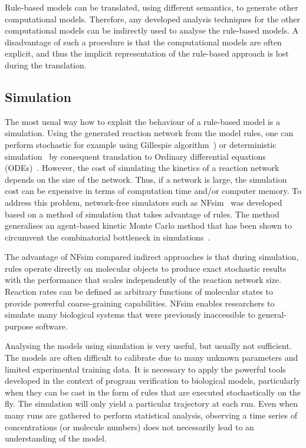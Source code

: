 \documentclass[11pt,a4paper]{report}
\begin{document}
Rule-based models can be translated, using different semantics, to generate other computational models. Therefore, any developed analysis techniques for the other computational models can be indirectly used to analyse the rule-based models. A disadvantage of such a procedure is that the computational models are often explicit, and thus the implicit representation of the rule-based approach is lost during the translation.

\subsection{Simulation}

The most usual way how to exploit the behaviour of a rule-based model is a simulation. Using the generated reaction network from the model rules, one can perform stochastic for example using Gillespie algorithm~\cite{GILLESPIE1976403}) or deterministic simulation~\cite{Poole2000} by consequent translation to Ordinary differential equations (ODEs)~\cite{higham2008modeling}. However, the cost of simulating the kinetics of a reaction network depends on the size of the network. Thus, if a network is large, the simulation cost can be expensive in terms of computation time and/or computer memory. To address this problem, network-free simulators such as NFsim~\cite{sneddon2011efficient} was developed based on a method of simulation that takes advantage of rules. The method generalises an agent-based kinetic Monte Carlo method that has been shown to circumvent the combinatorial bottleneck in simulations~\cite{yang2008kinetic}.

The advantage of NFsim compared indirect approaches is that during simulation, rules operate directly on molecular objects to produce exact stochastic results with the performance that scales independently of the reaction network size. Reaction rates can be defined as arbitrary functions of molecular states to provide powerful coarse-graining capabilities. NFsim enables researchers to simulate many biological systems that were previously inaccessible to general-purpose software.

Analysing the models using simulation is very useful, but usually not sufficient. The models are often difficult to calibrate due to many unknown parameters and limited experimental training data. It is necessary to apply the powerful tools developed in the context of program verification to biological models, particularly when
they can be cast in the form of rules that are executed stochastically on the fly. The simulation will only yield a particular trajectory at each run. Even when many runs are gathered to perform statistical analysis, observing a time series of concentrations (or molecule numbers) does not necessarily lead to an understanding of the model.
\end{document}

